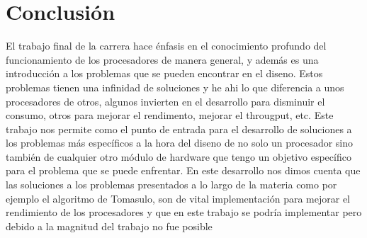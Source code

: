 \section{Conclusi\'on}
El trabajo final de la carrera hace \'enfasis en el conocimiento profundo del funcionamiento de los procesadores de manera general, y adem\'as es una introducci\'on a los problemas que se pueden encontrar en el diseno. 
Estos problemas tienen una infinidad de soluciones y he ahi lo que diferencia a unos procesadores de otros, algunos invierten en el desarrollo para disminuir el consumo, otros para mejorar el rendimento, mejorar el througput, etc. 
Este trabajo nos permite como el punto de entrada para el desarrollo de soluciones a los problemas m\'as espec\'ificos a la hora del diseno de no solo un procesador sino tambi\'en de cualquier otro m\'odulo de hardware que tengo un objetivo espec\'ifico para el problema que se puede enfrentar. En este desarrollo nos dimos cuenta que las soluciones a los problemas presentados a lo largo de la materia como por ejemplo el algoritmo de Tomasulo, son de vital implementaci\'on para mejorar el rendimiento de los procesadores y que en este trabajo se podr\'ia implementar pero debido a la magnitud del trabajo no fue posible  